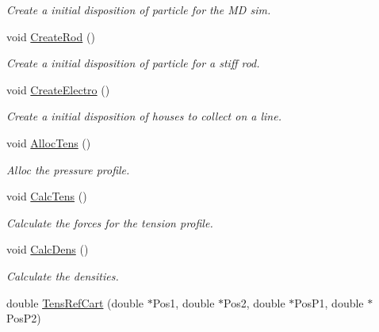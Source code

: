 \begin{DoxyCompactItemize}
\begin{DoxyCompactList}\small\item\em Create a initial disposition of particle for the MD sim. \end{DoxyCompactList}\item 
void \hyperlink{classForces_ae3378b62462d086cb39724e03074fb97}{Create\+Rod} ()\hypertarget{classForces_ae3378b62462d086cb39724e03074fb97}{}\label{classForces_ae3378b62462d086cb39724e03074fb97}

\begin{DoxyCompactList}\small\item\em Create a initial disposition of particle for a stiff rod. \end{DoxyCompactList}\item 
void \hyperlink{classForces_a6ef0b763f3b80142cda476d73e2753a5}{Create\+Electro} ()\hypertarget{classForces_a6ef0b763f3b80142cda476d73e2753a5}{}\label{classForces_a6ef0b763f3b80142cda476d73e2753a5}

\begin{DoxyCompactList}\small\item\em Create a initial disposition of houses to collect on a line. \end{DoxyCompactList}\item 
void \hyperlink{classForces_ac6a2e2465107cd1b6eea81aeb80646c2}{Alloc\+Tens} ()\hypertarget{classForces_ac6a2e2465107cd1b6eea81aeb80646c2}{}\label{classForces_ac6a2e2465107cd1b6eea81aeb80646c2}

\begin{DoxyCompactList}\small\item\em Alloc the pressure profile. \end{DoxyCompactList}\item 
void \hyperlink{classForces_a69a4a0318fb6e0382d6e2288a40c9e98}{Calc\+Tens} ()\hypertarget{classForces_a69a4a0318fb6e0382d6e2288a40c9e98}{}\label{classForces_a69a4a0318fb6e0382d6e2288a40c9e98}

\begin{DoxyCompactList}\small\item\em Calculate the forces for the tension profile. \end{DoxyCompactList}\item 
void \hyperlink{classForces_a44c4bed1843e51f20f252a5dd05f64fe}{Calc\+Dens} ()\hypertarget{classForces_a44c4bed1843e51f20f252a5dd05f64fe}{}\label{classForces_a44c4bed1843e51f20f252a5dd05f64fe}

\begin{DoxyCompactList}\small\item\em Calculate the densities. \end{DoxyCompactList}\item 
double \hyperlink{classForces_afad21f344bdeced26172aaf70d26e844}{Tens\+Ref\+Cart} (double $\ast$Pos1, double $\ast$Pos2, double $\ast$Pos\+P1, double $\ast$Pos\+P2)\hypertarget{classForces_afad21f344bdeced26172aaf70d26e844}{}\label{classForces_afad21f344bdeced26172aaf70d26e844}


\end{DoxyCompactItemize}
